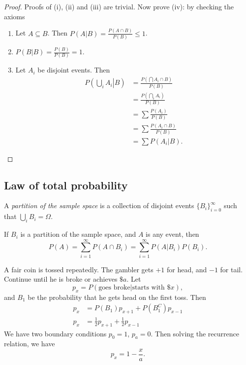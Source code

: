 \documentclass[a4paper]{article}
\begin{document}
\begin{proof}
  Proofs of (i), (ii) and (iii) are trivial. Now prove (iv): by checking the axioms

  \begin{enumerate}
    \item Let $A\subseteq B$. Then $P(A|B) = \frac{P(A\cap B)}{P(B)} \leq 1$.
    \item $P(B|B) = \frac{P(B)}{P(B)} = 1$.
    \item Let $A_i$ be disjoint events. Then 
      \begin{align*}
        P\left(\left.\bigcup_i A_i\right|B\right) &= \frac{P(\bigcap A_i\cap B)}{P(B)}\\
        &= \frac{P\left(\bigcap_i A_i\right)}{P(B)}\\
        &= \sum \frac{P(A_i)}{P(B)}\\
        &=\sum \frac{P(A_i\cap B)}{P(B)}\\
        &= \sum P(A_i | B).
      \end{align*}
  \end{enumerate}
\end{proof}
\subsection{Law of total probability}
\begin{defi}[Partition]
  A \emph{partition of the sample space} is a collection of disjoint events $\{B_i\}_{i = 0}^\infty$ such that $\bigcup_i B_i = \Omega$.
\end{defi}

\begin{prop}
  If $B_i$ is a partition of the sample space, and $A$ is any event, then
  \[
    P(A) = \sum_{i = 1}^\infty P(A\cap B_i) = \sum_{i = 1}^\infty P(A|B_i) P(B_i).
  \]
\end{prop}

\begin{eg}
  A fair coin is tossed repeatedly. The gambler gets $+1$ for head, and $-1$ for tail. Continue until he is broke or achieves $\$a$. Let
  \[
    p_x = P(\text{goes broke}|\text{starts with \$}x),
  \]
  and $B_1$ be the probability that he gets head on the first toss. Then
  \begin{align*}
    p_x &= P(B_1)p_{x + 1} + P(B_1^C) p_{x - 1}\\
    p_x &= \frac{1}{2}p_{x + 1} + \frac{1}{2}p_{x - 1}
  \end{align*}
  We have two boundary conditions $p_0 = 1$, $p_a = 0$. Then solving the recurrence relation, we have
  \[
    p_x = 1 - \frac{x}{a}.
  \]
\end{eg}
\end{document}
